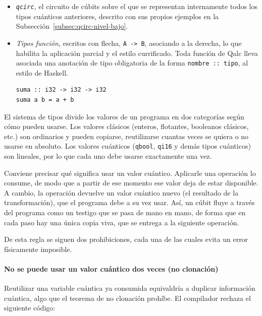 \begin{itemize}
  \item \textit{\lstinline|qcirc|,} el circuito de cúbits sobre el que se representan internamente todos los tipos cuánticos anteriores, descrito con sus propios ejemplos en la Subsección~\ref{subsec:qcirc-nivel-bajo}.

  \item \textit{Tipos función,} escritos con flecha, \lstinline|A -> B|, asociando a la derecha, lo que habilita la aplicación parcial y el estilo currificado. Toda función de Qalc lleva asociada una anotación de tipo obligatoria de la forma \lstinline|nombre :: tipo|, al estilo de Haskell.

\begin{lstlisting}[language={}, caption=Firma y definición de una función de dos argumentos currificada]
suma :: i32 -> i32 -> i32
suma a b = a + b
\end{lstlisting}

\end{itemize}

\label{sec:disciplina_lineal_uso}

El sistema de tipos divide los valores de un programa en dos categorías según cómo pueden usarse. Los valores clásicos (enteros, flotantes, booleanos clásicos, etc.) son ordinarios y pueden copiarse, reutilizarse cuantas veces se quiera o no usarse en absoluto. Los valores cuánticos (\lstinline|qbool|, \lstinline|qi16| y demás tipos cuánticos) son lineales, por lo que cada uno debe usarse exactamente una vez.

Conviene precisar qué significa usar un valor cuántico. Aplicarle una operación lo consume, de modo que a partir de ese momento ese valor deja de estar disponible. A cambio, la operación devuelve un valor cuántico nuevo (el resultado de la transformación), que el programa debe a su vez usar. Así, un cúbit fluye a través del programa como un testigo que se pasa de mano en mano, de forma que en cada paso hay una única copia viva, que se entrega a la siguiente operación.

De esta regla se siguen dos prohibiciones, cada una de las cuales evita un error físicamente imposible.

\paragraph{No se puede usar un valor cuántico dos veces (no clonación)}
Reutilizar una variable cuántica ya consumida equivaldría a duplicar información cuántica, algo que el teorema de no clonación prohíbe. El compilador rechaza el siguiente código:

